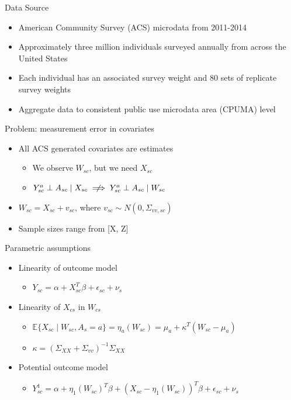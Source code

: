 \documentclass[hyperref={pdfpagelabels=false}]{beamer}
\begin{document}
\begin{frame}{Data Source}
    \begin{itemize}
    \item American Community Survey (ACS) microdata from 2011-2014 \bigskip 
    \item Approximately three million individuals surveyed annually from across the United States \bigskip 
    \item Each individual has an associated survey weight and 80 sets of replicate survey weights \bigskip 
    \item Aggregate data to consistent public use microdata area (CPUMA) level
    \end{itemize}
\end{frame}   

\begin{frame}{Problem: measurement error in covariates}
    \begin{itemize}
        \item All ACS generated covariates are estimates \bigskip
        \begin{itemize}
            \item We observe $W_{sc}$, but we need $X_{sc}$ \bigskip
            \item $Y_{sc}^a \perp A_{sc} \mid X_{sc} \centernot\implies Y_{sc}^a \perp A_{sc} \mid W_{sc}$ \bigskip
        \end{itemize}
        \item $W_{sc} = X_{sc} + v_{sc}$, where $v_{sc} \sim N(0, \Sigma_{vv, sc})$ \bigskip
        \item Sample sizes range from [X, Z] \bigskip
    \end{itemize}
\end{frame}

\begin{frame}{Parametric assumptions}
    \begin{itemize}
        \item Linearity of outcome model \bigskip
        \begin{itemize}
            \item $Y_{sc} = \alpha + X_{sc}^T\beta + \epsilon_{sc} + \nu_s$ \bigskip
        \end{itemize}
        \item Linearity of $X_{cs}$ in $W_{cs}$ \bigskip 
        \begin{itemize}
            \item $\mathbb{E}\{X_{sc} \mid W_{sc}, A_s = a\} = \eta_a(W_{sc}) = \mu_a + \kappa^T(W_{sc} - \mu_a)$ \bigskip
            \item $\kappa = (\Sigma_{XX} + \Sigma_{vv})^{-1}\Sigma_{XX}$ \bigskip
        \end{itemize}
        \item Potential outcome model \bigskip
        \begin{itemize}
            \item $Y_{sc}^1 = \alpha + \eta_1(W_{sc})^T\beta + (X_{sc} - \eta_1(W_{sc}))^T\beta + \epsilon_{sc} + \nu_{s}$
        \end{itemize}
    \end{itemize}
\end{frame}
\end{document}
